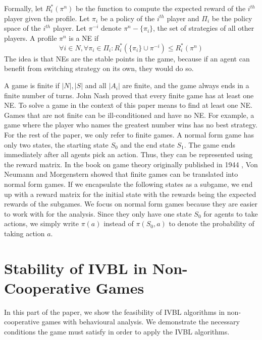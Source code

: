 \documentclass[]{interact}
\theoremstyle{plain}%
\theoremstyle{definition}
\theoremstyle{remark}
\begin{document}
Formally, let $R_i^*(\pi^n)$ be the function to compute the expected reward of the $i^{th}$ player given the profile. Let $\pi_i$ be a policy of the $i^{th}$ player and $\Pi_i$ be the policy space of the $i^{th}$ player. Let $\pi^{-i}$ denote $\pi^n - \{\pi_i\}$, the set of strategies of all other players. A profile $\pi^n$ is a NE if
\begin{equation}
    \forall i \in N, \forall \pi_i \in \Pi_i: R_i^*(\{\pi_i\} \cup \pi^{-i}) \leqslant R_i^*(\pi^n)
    \label{eq:nash}
\end{equation}
The idea is that NEs are the stable points in the game, because if an agent can benefit from switching strategy on its own, they would do so.

A game is finite if $|N|, |S|$ and all $|A_i|$ are finite, and the game always ends in a finite number of turns. John Nash proved that every finite game has at least one NE. To solve a game in the context of this paper means to find at least one NE. Games that are not finite can be ill-conditioned and have no NE. For example, a game where the player who names the greatest number wins has no best strategy. For the rest of the paper, we only refer to finite games. A normal form game has only two states, the starting state $S_0$ and the end state $S_1$. The game ends immediately after all agents pick an action. Thus, they can be represented using the reward matrix. In the book on game theory originally published in 1944 \cite{von2007theory}, Von Neumann and Morgenstern showed that finite games can be translated into normal form games. If we encapsulate the following states as a subgame, we end up with a reward matrix for the initial state with the rewards being the expected rewards of the subgames. We focus on normal form games because they are easier to work with for the analysis. Since they only have one state $S_0$ for agents to take actions, we simply write $\pi(a)$ instead of $\pi(S_0, a)$ to denote the probability of taking action $a$.

\section{Stability of IVBL in Non-Cooperative Games}
In this part of the paper, we show the feasibility of IVBL algorithms in non-cooperative games with behavioural analysis. We demonstrate the necessary conditions the game must satisfy in order to apply the IVBL algorithms.
\end{document}
